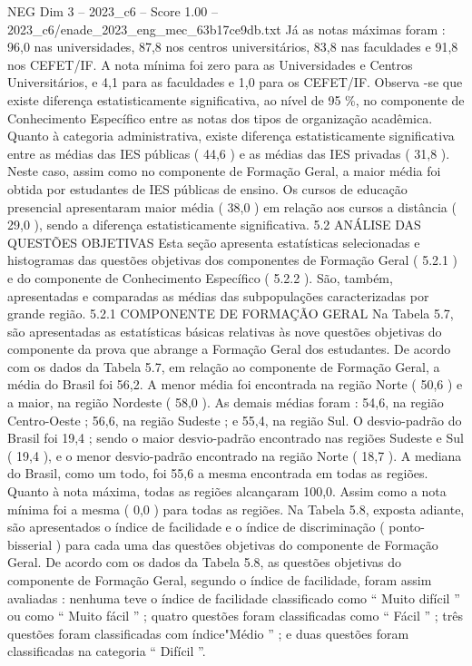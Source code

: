 \begin{textsample}{NEG Dim 3 – 2023\_c6 – Score 1.00 – 2023\_c6/enade\_2023\_eng\_mec\_63b17ce9db.txt}
Já as notas máximas foram : 96,0 nas universidades, 87,8 nos centros universitários, 83,8 nas faculdades e 91,8 nos CEFET/IF.
A nota mínima foi zero para as Universidades e Centros Universitários, e 4,1 para as faculdades e 1,0 para os CEFET/IF.
Observa -se que existe diferença estatisticamente significativa, ao nível de 95 \%, no componente de Conhecimento Específico entre as notas dos tipos de organização acadêmica.
Quanto à categoria administrativa, existe diferença estatisticamente significativa entre as médias das IES públicas ( 44,6 ) e as médias das IES privadas ( 31,8 ).
Neste caso, assim como no componente de Formação Geral, a maior média foi obtida por estudantes de IES públicas de ensino.
Os cursos de educação presencial apresentaram maior média ( 38,0 ) em relação aos cursos a distância ( 29,0 ), sendo a diferença estatisticamente significativa. 5.2 ANÁLISE DAS QUESTÕES OBJETIVAS Esta seção apresenta estatísticas selecionadas e histogramas das questões objetivas dos componentes de Formação Geral ( 5.2.1 ) e do componente de Conhecimento Específico ( 5.2.2 ).
São, também, apresentadas e comparadas as médias das subpopulações caracterizadas por grande região. 5.2.1 COMPONENTE DE FORMAÇÃO GERAL Na Tabela 5.7, são apresentadas as estatísticas básicas relativas às nove questões objetivas do componente da prova que abrange a Formação Geral dos estudantes.
De acordo com os dados da Tabela 5.7, em relação ao componente de Formação Geral, a média do Brasil foi 56,2.
A menor média foi encontrada na região Norte ( 50,6 ) e a maior, na região Nordeste ( 58,0 ).
As demais médias foram : 54,6, na região Centro-Oeste ; 56,6, na região Sudeste ; e 55,4, na região Sul.
O desvio-padrão do Brasil foi 19,4 ; sendo o maior desvio-padrão encontrado nas regiões Sudeste e Sul ( 19,4 ), e o menor desvio-padrão encontrado na região Norte ( 18,7 ).
A mediana do Brasil, como um todo, foi 55,6 a mesma encontrada em todas as regiões.
Quanto à nota máxima, todas as regiões alcançaram 100,0.
Assim como a nota mínima foi a mesma ( 0,0 ) para todas as regiões.
Na Tabela 5.8, exposta adiante, são apresentados o índice de facilidade e o índice de discriminação ( ponto-bisserial ) para cada uma das questões objetivas do componente de Formação Geral.
De acordo com os dados da Tabela 5.8, as questões objetivas do componente de Formação Geral, segundo o índice de facilidade, foram assim avaliadas : nenhuma teve o índice de facilidade classificado como “ Muito difícil ” ou como “ Muito fácil ” ; quatro questões foram classificadas como “ Fácil ” ; três questões foram classificadas com índice"Médio ” ; e duas questões foram classificadas na categoria “ Difícil ”.

\end{textsample}
